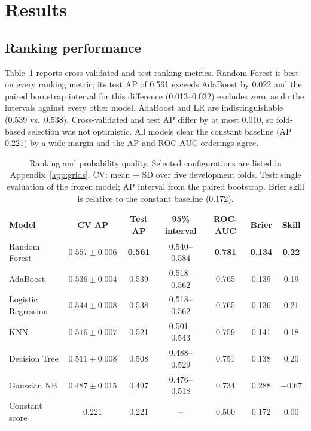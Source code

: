 \documentclass{article}
\begin{document}
\section{Results}
\label{sec:results}
\subsection{Ranking performance}
Table~\ref{tab:ranking} reports cross-validated and test ranking metrics. Random Forest is best on every ranking metric; its test AP of 0.561 exceeds AdaBoost by 0.022 and the paired bootstrap interval for this difference (0.013--0.032) excludes zero, as do the intervals against every other model. AdaBoost and LR are indistinguishable (0.539 vs.\ 0.538). Cross-validated and test AP differ by at most 0.010, so fold-based selection was not optimistic. All models clear the constant baseline (AP 0.221) by a wide margin and the AP and ROC-AUC orderings agree.

\begin{table}[t]
  \caption{Ranking and probability quality. Selected configurations are listed in Appendix~\ref{app:grids}. CV: mean $\pm$ SD over five development folds. Test: single evaluation of the frozen model; AP interval from the paired bootstrap. Brier skill is relative to the constant baseline (0.172).}
  \label{tab:ranking}
  \centering
  \small
  \begin{tabular}{@{}lcccccc@{}}
    \toprule
    Model & CV AP & Test AP & 95\% interval & ROC-AUC & Brier & Skill \\
    \midrule
    Random Forest & $0.557\pm0.006$ & \textbf{0.561} & 0.540--0.584 & \textbf{0.781} & \textbf{0.134} & \textbf{0.22} \\
    AdaBoost & $0.536\pm0.004$ & 0.539 & 0.518--0.562 & 0.765 & 0.139 & 0.19 \\
    Logistic Regression & $0.544\pm0.008$ & 0.538 & 0.518--0.562 & 0.765 & 0.136 & 0.21 \\
    KNN & $0.516\pm0.007$ & 0.521 & 0.501--0.543 & 0.759 & 0.141 & 0.18 \\
    Decision Tree & $0.511\pm0.008$ & 0.508 & 0.488--0.529 & 0.751 & 0.138 & 0.20 \\
    Gaussian NB & $0.487\pm0.015$ & 0.497 & 0.476--0.518 & 0.734 & 0.288 & $-0.67$ \\
    \midrule
    Constant score & 0.221 & 0.221 & -- & 0.500 & 0.172 & 0.00 \\
    \bottomrule
  \end{tabular}
\end{table}
\end{document}
